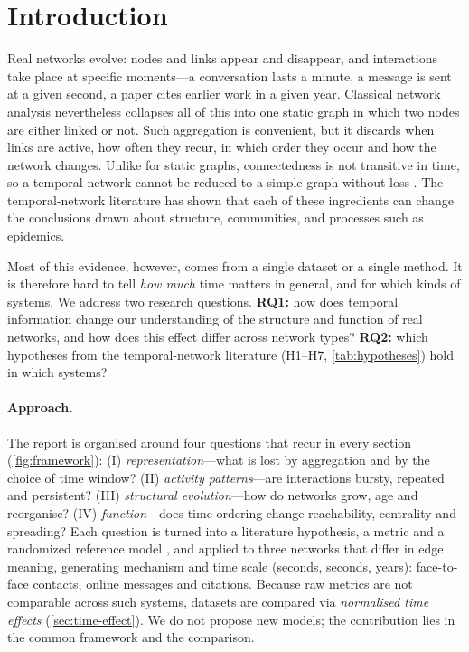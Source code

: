 \section{Introduction}
\label{sec:intro}
Real networks evolve: nodes and links appear and disappear, and interactions take
place at specific moments---a conversation lasts a minute, a message is sent at a
given second, a paper cites earlier work in a given year. Classical network analysis
nevertheless collapses all of this into one static graph in which two nodes are either
linked or not. Such aggregation is convenient, but it discards when links are active,
how often they recur, in which order they occur and how the network changes. Unlike
for static graphs, connectedness is not transitive in time, so a temporal network cannot
be reduced to a simple graph without loss \citep{holme2015modern}. The
temporal-network literature \citep{holme2012temporal,holme2015modern,masuda2016guide}
has shown that each of these ingredients can change the conclusions drawn about
structure, communities, and processes such as epidemics.

Most of this evidence, however, comes from a single dataset or a single method. It
is therefore hard to tell \emph{how much} time matters in general, and for which kinds
of systems. We address two research questions.
\textbf{RQ1:} how does temporal information change our understanding of the structure
and function of real networks, and how does this effect differ across network types?
\textbf{RQ2:} which hypotheses from the temporal-network literature (H1--H7,
\cref{tab:hypotheses}) hold in which systems?

\paragraph{Approach.}
The report is organised around four questions that recur in every section
(\cref{fig:framework}): (I) \emph{representation}---what is lost by aggregation and
by the choice of time window? (II) \emph{activity patterns}---are interactions bursty,
repeated and persistent? (III) \emph{structural evolution}---how do networks grow,
age and reorganise? (IV) \emph{function}---does time ordering change reachability,
centrality and spreading? Each question is turned into a literature hypothesis, a
metric and a randomized reference model \citep{gauvin2022randomized}, and applied to
three networks that differ in edge meaning, generating mechanism and time scale
(seconds, seconds, years): face-to-face contacts, online messages and citations.
Because raw metrics are not comparable across such systems, datasets are compared via
\emph{normalised time effects} (\cref{sec:time-effect}). We do not propose new
models; the contribution lies in the common framework and the comparison.

